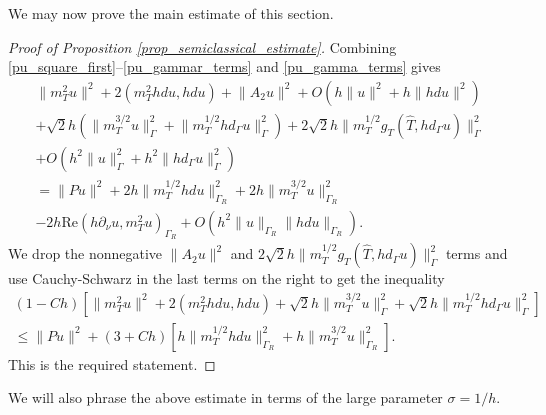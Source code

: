 \documentclass[11pt,letterpaper]{amsart}
\theoremstyle{definition}
\numberwithin{equation}{section}
\newcommand{\norm}[1]{\lVert #1 \rVert}         %
\newcommand{\p}{\partial}
\def\p{\partial}
\begin{document}
We may now prove the main estimate of this section.

\begin{proof}[Proof of Proposition \ref{prop_semiclassical_estimate}]
Combining \eqref{pu_square_first}--\eqref{pu_gammar_terms} and \eqref{pu_gamma_terms} gives
\begin{multline*}
\norm{m_T^2 u}^2 + 2 (m_T^2 hdu, hdu) + \norm{A_2 u}^2 + O(h \norm{u}^2 + h \norm{hdu}^2) \\
+ \sqrt{2} h (\norm{m_T^{3/2} u}_{\Gamma}^2 + \norm{m_T^{1/2} h d_{\Gamma} u}_{\Gamma}^2) + 2 \sqrt{2} h \norm{m_T^{1/2} g_T(\hat{T}, hd_{\Gamma} u)}_{\Gamma}^2 \\
 + O(h^2 \norm{u}_{\Gamma}^2 + h^2 \norm{hd_{\Gamma} u}_{\Gamma}^2) \\
 = \norm{Pu}^2 + 2h \norm{m_T^{1/2} h d u}_{\Gamma_R}^2 + 2 h \norm{m_T^{3/2} u}_{\Gamma_R}^2  \\
 - 2 h \mathrm{Re}( h \p_{\nu} u, m_T^2 u)_{\Gamma_R} + O(h^2 \norm{u}_{\Gamma_R} \norm{h d u}_{\Gamma_R}).
\end{multline*}
We drop the nonnegative $\norm{A_2 u}^2$ and $2 \sqrt{2} h \norm{m_T^{1/2} g_T(\hat{T}, hd_{\Gamma} u)}_{\Gamma}^2$ terms and use Cauchy-Schwarz in the last terms on the right to get the inequality 
\begin{multline*}
(1-Ch) \left[ \norm{m_T^2 u}^2 + 2 (m_T^2 hdu, hdu) + \sqrt{2} h \norm{m_T^{3/2} u}_{\Gamma}^2 +  \sqrt{2} h \norm{m_T^{1/2} h d_{\Gamma} u}_{\Gamma}^2 \right] \\
 \leq  \norm{Pu}^2 + (3+Ch) \left[ h \norm{m_T^{1/2} h d u}_{\Gamma_R}^2 + h \norm{m_T^{3/2} u}_{\Gamma_R}^2 \right].
\end{multline*}
This is the required statement.
\end{proof}


We will also phrase the above estimate in terms of the large parameter $\sigma = 1/h$.
\end{document}
